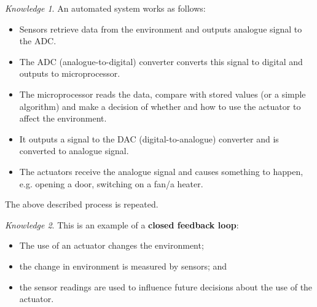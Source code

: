 \documentclass[8pt]{article}
\theoremstyle{remark}
\newtheorem{knowledge}{Knowledge}[subsection]
\begin{document}
            \begin{knowledge}
                An automated system works as follows:
                \begin{itemize}
                    \item Sensors retrieve data from the environment and outputs analogue signal to the ADC.
                    \item The ADC (analogue-to-digital) converter converts this signal to digital and outputs to microprocessor.
                    \item The microprocessor reads the data, compare with stored values (or a simple algorithm) and make a decision of whether and how to use the actuator to affect the environment.
                    \item It outputs a signal to the DAC (digital-to-analogue) converter and is converted to analogue signal.
                    \item The actuators receive the analogue signal and causes something to happen, e.g. opening a door, switching on a fan/a heater.
                \end{itemize}

                The above described process is repeated.
            \end{knowledge}

            \begin{knowledge}
                This is an example of a \textbf{closed feedback loop}:
                \begin{itemize}
                    \item The use of an actuator changes the environment;
                    \item the change in environment is measured by sensors; and
                    \item the sensor readings are used to influence future decisions about the use of the actuator.
                \end{itemize}
            \end{knowledge}
\end{document}
